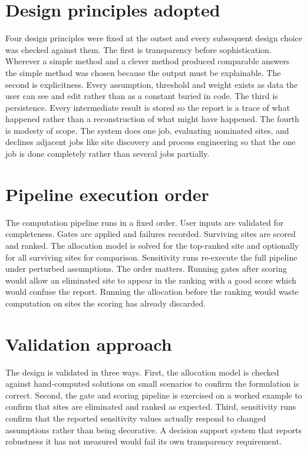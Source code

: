 \documentclass[12pt,a4paper]{report}
\begin{document}
\section{Design principles adopted}
Four design principles were fixed at the outset and every subsequent
design choice was checked against them. The first is transparency
before sophistication. Wherever a simple method and a clever method
produced comparable answers the simple method was chosen because the
output must be explainable. The second is explicitness. Every
assumption, threshold and weight exists as data the user can see and
edit rather than as a constant buried in code. The third is
persistence. Every intermediate result is stored so the report is a
trace of what happened rather than a reconstruction of what might
have happened. The fourth is modesty of scope. The system does one
job, evaluating nominated sites, and declines adjacent jobs like site
discovery and process engineering so that the one job is done
completely rather than several jobs partially.

\section{Pipeline execution order}
The computation pipeline runs in a fixed order. User inputs are
validated for completeness. Gates are applied and failures recorded.
Surviving sites are scored and ranked. The allocation model is solved
for the top-ranked site and optionally for all surviving sites for
comparison. Sensitivity runs re-execute the full pipeline under
perturbed assumptions. The order matters. Running gates after scoring
would allow an eliminated site to appear in the ranking with a good
score which would confuse the report. Running the allocation before
the ranking would waste computation on sites the scoring has already
discarded.

\section{Validation approach}
The design is validated in three ways. First, the allocation model is
checked against hand-computed solutions on small scenarios to confirm
the formulation is correct. Second, the gate and scoring pipeline is
exercised on a worked example to confirm that sites are eliminated and
ranked as expected. Third, sensitivity runs confirm that the reported
sensitivity values actually respond to changed assumptions rather than
being decorative. A decision support system that reports robustness it
has not measured would fail its own transparency requirement.
\end{document}
